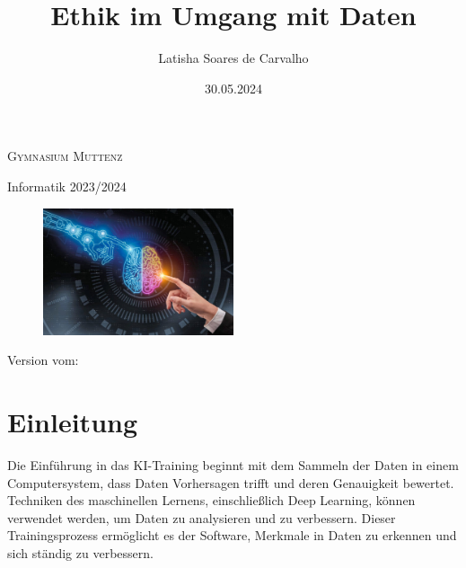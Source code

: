 \documentclass{report}
\title{Ethik im Umgang mit Daten}
\author{Latisha Soares de Carvalho}
\date{30.05.2024}
\begin{document}
\begin{titlepage}
    \makeatletter %
	\begin{center}
		{\scshape Gymnasium Muttenz} \vspace{0.5cm}

		 Informatik 2023/2024\vspace{5.5cm}

		{\huge\bfseries \@title}

        \vspace{1cm}

        \begin{figure}[h]
            \centering 
            \includegraphics[width=0.5\textwidth]{KI.jpg} 
            \end{figure}

		\vspace{2cm}

		{\Large\itshape \@author}

        \vspace{2cm}

        Version vom: \@date
	\end{center}
    
    \makeatother %
\end{titlepage}


\tableofcontents

\chapter{Einleitung}
Die Einführung in das KI-Training beginnt mit dem Sammeln der Daten in einem Computersystem, dass Daten Vorhersagen trifft und deren Genauigkeit bewertet.
 Techniken des maschinellen Lernens, einschließlich Deep Learning, können verwendet werden, um Daten zu analysieren und zu verbessern. 
    Dieser Trainingsprozess ermöglicht es der Software, Merkmale in Daten zu erkennen und sich ständig zu verbessern.
    
\end{document}
